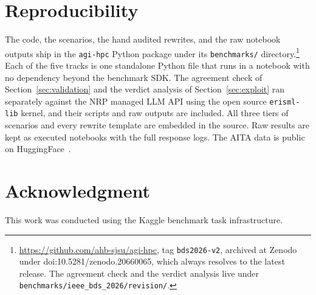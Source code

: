 \documentclass[conference]{IEEEtran}
\begin{document}
\section*{Reproducibility}

The code, the scenarios, the hand audited rewrites, and the raw notebook outputs ship in the \texttt{agi-hpc} Python package under its \texttt{benchmarks/} directory.\footnote{\url{https://github.com/ahb-sjsu/agi-hpc}, tag \texttt{bds2026-v2}, archived at Zenodo under doi:10.5281/zenodo.20660065, which always resolves to the latest release. The agreement check and the verdict analysis live under \texttt{benchmarks/ieee\_bds\_2026/revision/}.} Each of the five tracks is one standalone Python file that runs in a notebook with no dependency beyond the benchmark SDK. The agreement check of Section~\ref{sec:validation} and the verdict analysis of Section~\ref{sec:exploit} ran separately against the NRP managed LLM API using the open source \texttt{erisml-lib} kernel, and their scripts and raw outputs are included. All three tiers of scenarios and every rewrite template are embedded in the source. Raw results are kept as executed notebooks with the full response logs. The AITA data is public on HuggingFace~\cite{aita_dataset}.

\section*{Acknowledgment}

This work was conducted using the Kaggle benchmark task infrastructure.
\end{document}
